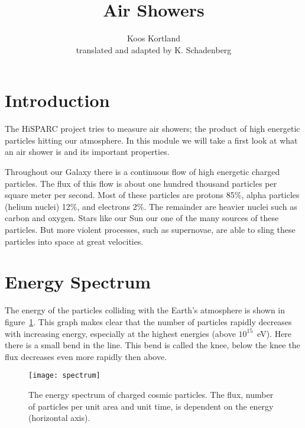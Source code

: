 



\author{Koos Kortland \\ translated and adapted by K. Schadenberg}
\date{}
\title{Air Showers}



\maketitle

\section{Introduction}
The HiSPARC project tries to measure air showers; the product of high energetic particles hitting our atmosphere. In this module we will take a first look at what an air shower is and its important properties.

Throughout our Galaxy there is a continuous flow of high energetic charged particles. The flux of this flow is about one hundred thousand particles per square meter per second. Most of these particles are protons 85\%, alpha particles (helium nuclei) 12\%, and electrons 2\%. The remainder are heavier nuclei such as carbon and oxygen. Stars like our Sun our one of the many sources of these particles. But more violent processes, such as supernovae, are able to sling these particles into space at great velocities.

\section{Energy Spectrum}
The energy of the particles colliding with the Earth's atmosphere is shown in figure~\ref{fig:spectrum}. This graph makes clear that the number of particles rapidly decreases with increasing energy, especially at the highest energies (above $10^{15}$~eV). Here there is a small bend in the line. This bend is called the knee, below the knee the flux decreases even more rapidly then above.

\begin{figure}\begin{center}
\texttt{[image: spectrum]}%
\caption{The energy spectrum of charged cosmic particles. The flux, number of particles per unit area and unit time, is dependent on the energy (horizontal axis).}\label{fig:spectrum}
\end{center}\end{figure}

